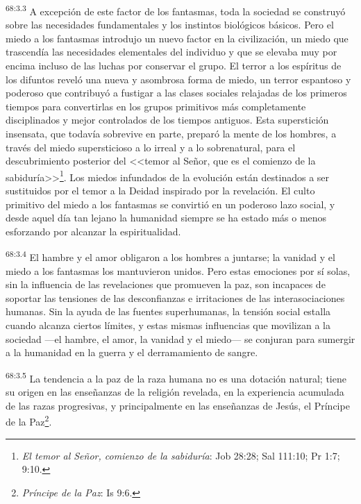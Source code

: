 \documentclass[twoside, 11pt]{book}
\begin{document}
\par
\textsuperscript{68:3.3} A excepción de este factor de los fantasmas, toda la sociedad se construyó sobre las necesidades fundamentales y los instintos biológicos básicos. Pero el miedo a los fantasmas introdujo un nuevo factor en la civilización, un miedo que trascendía las necesidades elementales del individuo y que se elevaba muy por encima incluso de las luchas por conservar el grupo. El terror a los espíritus de los difuntos reveló una nueva y asombrosa forma de miedo, un terror espantoso y poderoso que contribuyó a fustigar a las clases sociales relajadas de los primeros tiempos para convertirlas en los grupos primitivos más completamente disciplinados y mejor controlados de los tiempos antiguos. Esta superstición insensata, que todavía sobrevive en parte, preparó la mente de los hombres, a través del miedo supersticioso a lo irreal y a lo sobrenatural, para el descubrimiento posterior del <<temor al Señor, que es el comienzo de la sabiduría>>\footnote{\textit{El temor al Señor, comienzo de la sabiduría}: Job 28:28; Sal 111:10; Pr 1:7; 9:10.}. Los miedos infundados de la evolución están destinados a ser sustituidos por el temor a la Deidad inspirado por la revelación. El culto primitivo del miedo a los fantasmas se convirtió en un poderoso lazo social, y desde aquel día tan lejano la humanidad siempre se ha estado más o menos esforzando por alcanzar la espiritualidad.

\par
\textsuperscript{68:3.4} El hambre y el amor obligaron a los hombres a juntarse; la vanidad y el miedo a los fantasmas los mantuvieron unidos. Pero estas emociones por sí solas, sin la influencia de las revelaciones que promueven la paz, son incapaces de soportar las tensiones de las desconfianzas e irritaciones de las interasociaciones humanas. Sin la ayuda de las fuentes superhumanas, la tensión social estalla cuando alcanza ciertos límites, y estas mismas influencias que movilizan a la sociedad ---el hambre, el amor, la vanidad y el miedo--- se conjuran para sumergir a la humanidad en la guerra y el derramamiento de sangre.

\par
\textsuperscript{68:3.5} La tendencia a la paz de la raza humana no es una dotación natural; tiene su origen en las enseñanzas de la religión revelada, en la experiencia acumulada de las razas progresivas, y principalmente en las enseñanzas de Jesús, el Príncipe de la Paz\footnote{\textit{Príncipe de la Paz}: Is 9:6.}.
\end{document}
